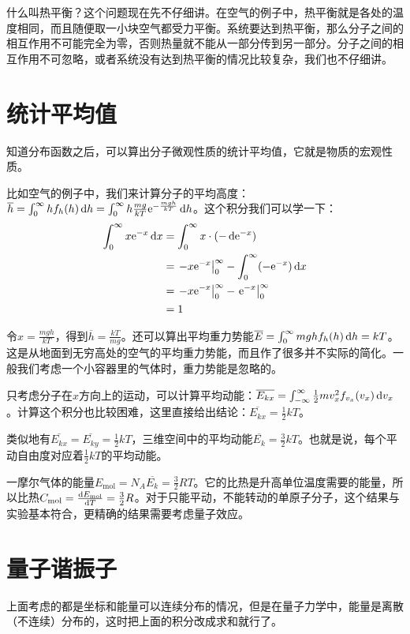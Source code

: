 什么叫热平衡？这个问题现在先不仔细讲。在空气的例子中，热平衡就是各处的温度相同，而且随便取一小块空气都受力平衡。系统要达到热平衡，那么分子之间的相互作用不可能完全为零，否则热量就不能从一部分传到另一部分。分子之间的相互作用不可忽略，或者系统没有达到热平衡的情况比较复杂，我们也不仔细讲。
\section{统计平均值}
知道分布函数之后，可以算出分子微观性质的统计平均值，它就是物质的宏观性质。

比如空气的例子中，我们来计算分子的平均高度：$\overline{h}=\int_0^\infty h f_h(h) \mathop{}\!\mathrm{d} h=\int_0^\infty h \frac{m g}{k T} \mathrm{e}^{-\frac{m g h}{k T}} \mathop{}\!\mathrm{d} h$。这个积分我们可以学一下：
\begin{align*}
\int_0^\infty x \mathrm{e}^{-x} \mathop{}\!\mathrm{d} x&=\int_0^\infty x \cdot (-\mathop{}\!\mathrm{d} \mathrm{e}^{-x}) \\
&=\left. -x \mathrm{e}^{-x} \right|_0^\infty-\int_0^\infty (-\mathrm{e}^{-x}) \mathop{}\!\mathrm{d} x \\
&=\left. -x \mathrm{e}^{-x} \right|_0^\infty-\left. \mathrm{e}^{-x} \right|_0^\infty \\
&=1
\end{align*}

令$x=\frac{m g h}{k T}$，得到$\overline{h}=\frac{k T}{m g}$。还可以算出平均重力势能$\overline{E}=\int_0^\infty m g h f_h(h) \mathop{}\!\mathrm{d} h=k T$。这是从地面到无穷高处的空气的平均重力势能，而且作了很多并不实际的简化。一般我们考虑一个小容器里的气体时，重力势能是忽略的。

只考虑分子在$x$方向上的运动，可以计算平均动能：$\overline{E_{k x}}=\int_{-\infty}^\infty \frac{1}{2} m v_x^2 f_{v_x}(v_x) \mathop{}\!\mathrm{d} v_x$。计算这个积分也比较困难，这里直接给出结论：$\overline{E_{k x}}=\frac{1}{2} k T$。

类似地有$\overline{E_{k x}}=\overline{E_{k y}}=\frac{1}{2} k T$，三维空间中的平均动能$\overline{E_k}=\frac{3}{2} k T$。也就是说，每个平动自由度对应着$\frac{1}{2} k T$的平均动能。

一摩尔气体的能量$E_\text{mol}=N_A \overline{E_k}=\frac{3}{2} R T$。它的比热是升高单位温度需要的能量，所以比热$C_\text{mol}=\frac{\mathop{}\!\mathrm{d} E_\text{mol}}{\mathop{}\!\mathrm{d} T}=\frac{3}{2} R$。对于只能平动，不能转动的单原子分子，这个结果与实验基本符合，更精确的结果需要考虑量子效应。
\section{量子谐振子}
上面考虑的都是坐标和能量可以连续分布的情况，但是在量子力学中，能量是离散（不连续）分布的，这时把上面的积分改成求和就行了。

